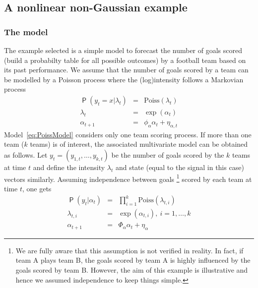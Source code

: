 \documentclass{article}
\DeclareMathOperator{\Prob}{\mathsf{P}}
\begin{document}
\subsection{ A nonlinear non-Gaussian example}

\subsubsection{The model}

The example selected is a simple model to forecast the number of goals scored (build a
probabilty table for all possible outcomes) by a football team based on its past
performance. We assume that the number of goals scored by a team can be modelled by a Poisson
process where the (log)intensity follows a Markovian process
\begin{equation}
  \begin{array}{rcl}
    \Prob(y_t=x |\lambda_t) & = & \text{Poiss} (\lambda_t) \\
    \lambda_t & = & \exp(\alpha_t) \\
    \alpha_{t+1} & = &  \phi_{\alpha} \alpha_{t} + \eta_{\alpha,t}
  \end{array}
  \label{eq:PoissModel}
\end{equation}
Model~\eqref{eq:PoissModel} considers only one team scoring process. If more than one team
($k$ teams) is of interest, the associated multivariate model can be obtained as follows. Let
$y_t = (y_{1,t},\dots, y_{k,t}) $ be the number of goals scored by the $k$ teams at time $t$
and define the intensity $\lambda_t$ and state (equal to the signal in this case) vectors
similarly. Assuming independence between goals \footnote{We are fully aware that this
  assumption is not verified in reality. In fact, if team A plays team B, the goals scored by
  team A is highly influenced by the goals scored by team B. However, the aim of this example
  is illustrative and hence we assumed independence to keep things simple.} scored by each
team at time $t$, one gets
\begin{equation}
  \begin{array}{rcl}
    \Prob(y_t|\alpha_t) & = & \displaystyle \prod_{i=1}^k \text{Poiss} (\lambda_{t,i}) \\
    \lambda_{t,i} & = & \exp(\alpha_{t,i}), \ i=1,\dots,k \\
    \alpha_{t+1} & = &  \Phi_{\alpha} \alpha_{t} + \eta_{\alpha}
  \end{array}
  \label{eq:PoissModel1}
\end{equation}
\end{document}
